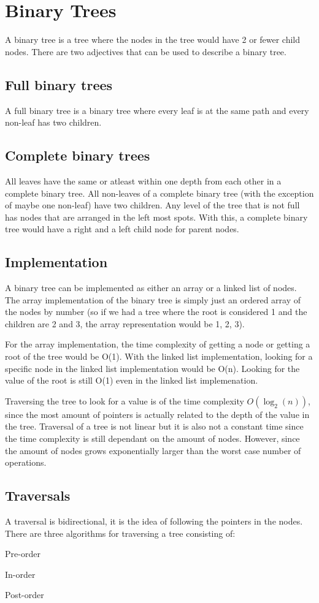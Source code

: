 \documentclass[11pt,a4paper,english]{article}
\begin{document}
\section{Binary Trees}

A binary tree is a tree where the nodes in the tree would have 2 or fewer child nodes. There are two adjectives that can be used to describe a binary tree.

\subsection{Full binary trees}

A full binary tree is a binary tree where every leaf is at the same path and every non-leaf has two children.

\subsection{Complete binary trees}

All leaves have the same or atleast within one depth from each other in a complete binary tree. All non-leaves of a complete binary tree (with the exception of maybe one non-leaf) have two children. Any level of the tree that is not full has nodes that are arranged in the left most spots. With this, a complete binary tree would have a right and a left child node for parent nodes.

\subsection{Implementation}

A binary tree can be implemented as either an array or a linked list of nodes. The array implementation of the binary tree is simply just an ordered array of the nodes by number (so if we had a tree where the root is considered 1 and the children are 2 and 3, the array representation would be 1, 2, 3).

\bigskip

\noindent For the array implementation, the time complexity of getting a node or getting a root of the tree would be O(1). With the linked list implementation, looking for a specific node in the linked list implementation would be O(n). Looking for the value of the root is still O(1) even in the linked list implemenation.


\bigskip
\noindent Traversing the tree to look for a value is of the time complexity $O(\log_{2}(n))$, since the most amount of pointers is actually related to the depth of the value in the tree. Traversal of a tree is not linear but it is also not a constant time since the time complexity is still dependant on the amount of nodes. However, since the amount of nodes grows exponentially larger than the worst case number of operations. 

\subsection{Traversals}

A traversal is bidirectional, it is the idea of following the pointers in the nodes. There are three algorithms for traversing a tree consisting of:
\begin{itemize} {

  \item Pre-order
  \item In-order
  \item Post-order

}\end{itemize}
\end{document}
